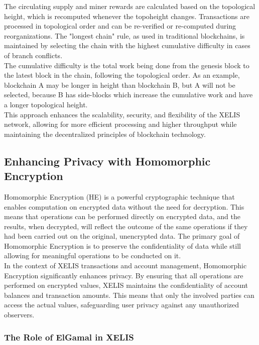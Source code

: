 \documentclass[10pt,a4paper,twocolumn]{article}
\begin{document}
The circulating supply and miner rewards are calculated based on the topological height, which is recomputed whenever the topoheight changes. Transactions are processed in topological order and can be re-verified or re-computed during reorganizations. The "longest chain" rule, as used in traditional blockchains, is maintained by selecting the chain with the highest cumulative difficulty in cases of branch conflicts.\\

The cumulative difficulty is the total work being done from the genesis block to the latest block in the chain, following the topological order. As an example, blockchain A may be longer in height than blockchain B, but A will not be selected, because B has side-blocks which increase the cumulative work and have a longer topological height.\\

This approach enhances the scalability, security, and flexibility of the XELIS network, allowing for more efficient processing and higher throughput while maintaining the decentralized principles of blockchain technology.\\

\subsection{Enhancing Privacy with Homomorphic Encryption}

Homomorphic Encryption (HE) is a powerful cryptographic technique that enables computation on encrypted data without the need for decryption. This means that operations can be performed directly on encrypted data, and the results, when decrypted, will reflect the outcome of the same operations if they had been carried out on the original, unencrypted data. The primary goal of Homomorphic Encryption is to preserve the confidentiality of data while still allowing for meaningful operations to be conducted on it.\\

In the context of XELIS transactions and account management, Homomorphic Encryption significantly enhances privacy. By ensuring that all operations are performed on encrypted values, XELIS maintains the confidentiality of account balances and transaction amounts. This means that only the involved parties can access the actual values, safeguarding user privacy against any unauthorized observers.\\

\subsubsection{The Role of ElGamal in XELIS}
\end{document}
